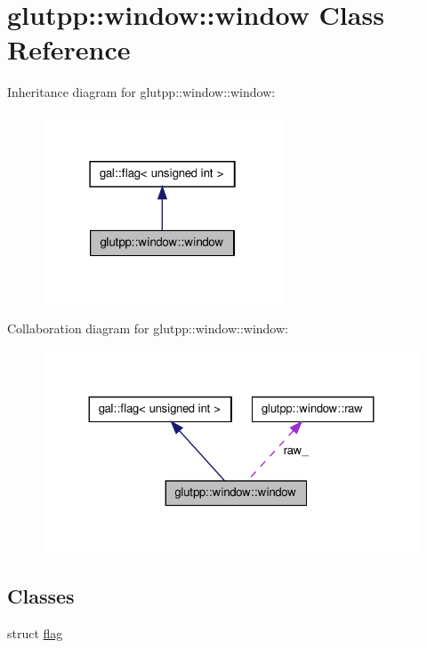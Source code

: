 \hypertarget{classglutpp_1_1window_1_1window}{\section{glutpp\-:\-:window\-:\-:window \-Class \-Reference}
\label{classglutpp_1_1window_1_1window}
}


\-Inheritance diagram for glutpp\-:\-:window\-:\-:window\-:
\nopagebreak
\begin{figure}[H]
\begin{center}
\leavevmode
\includegraphics[width=202pt]{classglutpp_1_1window_1_1window__inherit__graph}
\end{center}
\end{figure}


\-Collaboration diagram for glutpp\-:\-:window\-:\-:window\-:
\nopagebreak
\begin{figure}[H]
\begin{center}
\leavevmode
\includegraphics[width=324pt]{classglutpp_1_1window_1_1window__coll__graph}
\end{center}
\end{figure}
\subsection*{\-Classes}
\begin{DoxyCompactItemize}
\item 
struct \hyperlink{structglutpp_1_1window_1_1window_1_1flag}{flag}
\end{DoxyCompactItemize}
